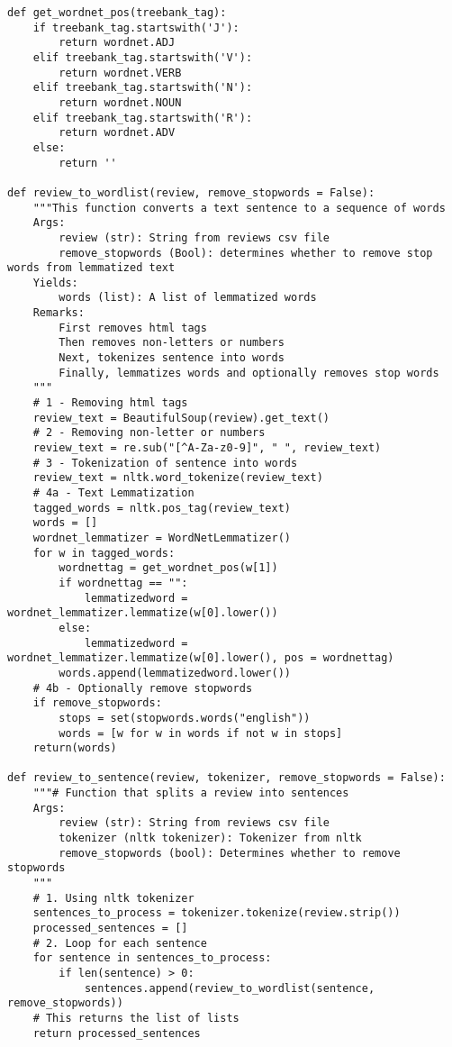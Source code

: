 \documentclass[12pt, letterpaper]{article}
\begin{document}
\begin{mdframed}[backgroundcolor=shadecolor]
\begin{verbatim}
def get_wordnet_pos(treebank_tag):
    if treebank_tag.startswith('J'):
        return wordnet.ADJ
    elif treebank_tag.startswith('V'):
        return wordnet.VERB
    elif treebank_tag.startswith('N'):
        return wordnet.NOUN
    elif treebank_tag.startswith('R'):
        return wordnet.ADV
    else:
        return ''

def review_to_wordlist(review, remove_stopwords = False):
    """This function converts a text sentence to a sequence of words
    Args:
        review (str): String from reviews csv file
        remove_stopwords (Bool): determines whether to remove stop words from lemmatized text
    Yields:
        words (list): A list of lemmatized words
    Remarks:
        First removes html tags
        Then removes non-letters or numbers
        Next, tokenizes sentence into words
        Finally, lemmatizes words and optionally removes stop words
    """
    # 1 - Removing html tags
    review_text = BeautifulSoup(review).get_text()
    # 2 - Removing non-letter or numbers
    review_text = re.sub("[^A-Za-z0-9]", " ", review_text)
    # 3 - Tokenization of sentence into words
    review_text = nltk.word_tokenize(review_text)
    # 4a - Text Lemmatization
    tagged_words = nltk.pos_tag(review_text)
    words = []
    wordnet_lemmatizer = WordNetLemmatizer()
    for w in tagged_words:
        wordnettag = get_wordnet_pos(w[1])
        if wordnettag == "":
            lemmatizedword = wordnet_lemmatizer.lemmatize(w[0].lower())
        else:
            lemmatizedword = wordnet_lemmatizer.lemmatize(w[0].lower(), pos = wordnettag)
        words.append(lemmatizedword.lower())
    # 4b - Optionally remove stopwords
    if remove_stopwords:
        stops = set(stopwords.words("english"))
        words = [w for w in words if not w in stops]
    return(words)
    
def review_to_sentence(review, tokenizer, remove_stopwords = False):
    """# Function that splits a review into sentences
    Args:
        review (str): String from reviews csv file
        tokenizer (nltk tokenizer): Tokenizer from nltk
        remove_stopwords (bool): Determines whether to remove stopwords
    """
    # 1. Using nltk tokenizer
    sentences_to_process = tokenizer.tokenize(review.strip())
    processed_sentences = []
    # 2. Loop for each sentence
    for sentence in sentences_to_process:
        if len(sentence) > 0:
            sentences.append(review_to_wordlist(sentence, remove_stopwords))
    # This returns the list of lists
    return processed_sentences
\end{verbatim}
\end{mdframed}
\end{document}
